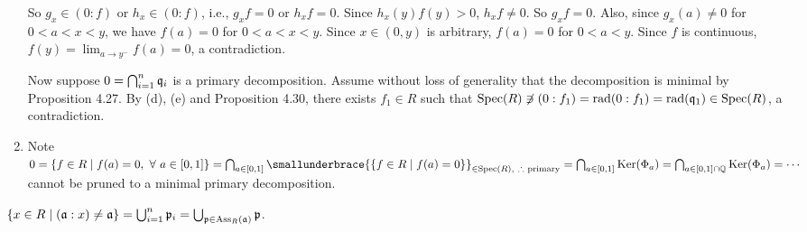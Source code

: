 \begin{example}
\begin{enumerate}
\begin{center}
            \end{center}
            So $g_x \in (0:f)$ or $h_x \in (0:f)$, i.e., $g_xf = 0$ or $h_xf =  0$. Since $h_x(y)f(y) > 0$, $h_xf \neq 0$. So $g_xf = 0$. Also, since $g_x(a) \neq 0$ for $0 < a < x < y$, we have $f(a) = 0$ for $0 < a < x < y$. Since $x \in (0,y)$ is arbitrary, $f(a) = 0$ for $0 < a < y$. Since $f$ is continuous, $f(y) = \lim_{a \to y^{-}}f(a) = 0$, a contradiction. \par 
            Now suppose $0 = \bigcap_{i=1}^{n}\mathfrak{q}_i$ is a primary decomposition. Assume without loss of generality that the decomposition is minimal by Proposition 4.27. By (d), (e) and Proposition 4.30, there exists $f_1 \in R$ such that $\operatorname{Spec}(R) \not \ni (0:f_1) = \operatorname{rad}(0:f_1) = \operatorname{rad}(\mathfrak{q}_1) \in \operatorname{Spec}(R)$, a contradiction. 
        \item Note $0 = \{f \in R \mid f(a) = 0, \fa a \in [0,1]\} = \bigcap_{a \in [0,1]} \smallunderbrace{\{f \in R \mid f(a) = 0\}}_{\in \operatorname{Spec}(R),\ \therefore \text{ primary}} = \bigcap_{a \in [0,1]} \ker(\Phi_a) = \bigcap_{a \in [0,1] \cap \bbQ} \ker(\Phi_a) = \cdots$ cannot be pruned to a minimal primary decomposition.
    \end{enumerate}
\end{example}

\begin{proposition}
    $\{x \in R \mid (\mathfrak{a}:x) \neq \mathfrak{a}\} = \bigcup_{i=1}^{n} \mathfrak{p}_i = \bigcup_{\mathfrak{p} \in \operatorname{Ass}_R(\mathfrak{a})} \mathfrak{p}$.
\end{proposition}

